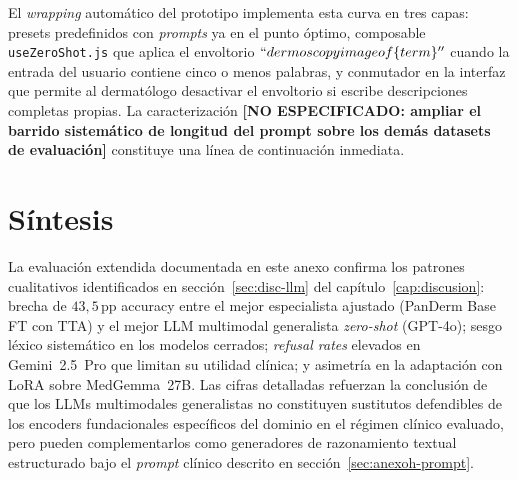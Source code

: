 El \emph{wrapping} automático del prototipo implementa esta curva
en tres capas: presets predefinidos con \emph{prompts} ya en el
punto óptimo, composable \texttt{useZeroShot.js} que aplica el
envoltorio $``dermoscopy image of \{term\}''$ cuando la entrada
del usuario contiene cinco o menos palabras, y conmutador en la
interfaz que permite al dermatólogo desactivar el envoltorio si
escribe descripciones completas propias. La caracterización
\textbf{[NO ESPECIFICADO: ampliar el barrido sistemático de
longitud del prompt sobre los demás datasets de evaluación]}
constituye una línea de continuación inmediata.

\section{Síntesis}
\label{sec:anexoh-sintesis}

La evaluación extendida documentada en este anexo confirma los
patrones cualitativos identificados en secci\'on~\ref{sec:disc-llm} del
capítulo~\ref{cap:discusion}: brecha de $43{,}5$\,pp accuracy
entre el mejor especialista ajustado (PanDerm Base FT con TTA) y el
mejor LLM multimodal generalista \emph{zero-shot} (GPT-4o); sesgo
léxico sistemático en los modelos cerrados; \emph{refusal rates}
elevados en Gemini~2.5~Pro que limitan su utilidad clínica; y
asimetría en la adaptación con LoRA sobre MedGemma~27B. Las
cifras detalladas refuerzan la conclusión de que los LLMs
multimodales generalistas no constituyen sustitutos defendibles
de los encoders fundacionales específicos del dominio en el
régimen clínico evaluado, pero pueden complementarlos como
generadores de razonamiento textual estructurado bajo el
\emph{prompt} clínico descrito en secci\'on~\ref{sec:anexoh-prompt}.
